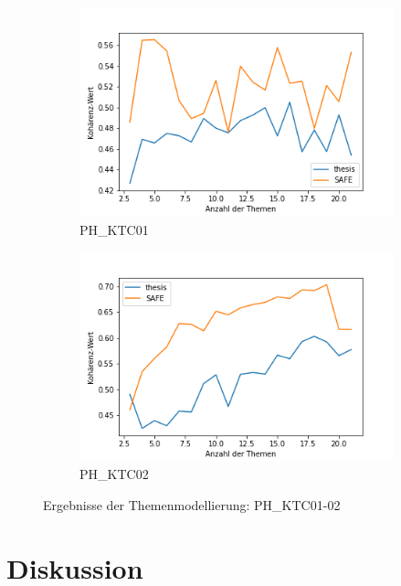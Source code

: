 \begin{figure}
     \centering
     \begin{subfigure}[b]{0.495\textwidth}
         \centering
         \includegraphics[width=\textwidth]{media/cs_PH_KTC01.png}
         \caption{PH\_KTC01}
         \label{fig:lda-ktc01}
     \end{subfigure}
     \hfill
     \begin{subfigure}[b]{0.495\textwidth}
         \centering
         \includegraphics[width=\textwidth]{media/cs_PH_KTC02.png}
         \caption{PH\_KTC02}
         \label{fig:lda-ktc02}
     \end{subfigure}
    \caption{Ergebnisse der Themenmodellierung: PH\_KTC01-02}
    \label{figs:tmtopiccoherence}
\end{figure}

\lipsum[1]

\section{Diskussion}
\label{sec:diskussion}

\lipsum[3]
